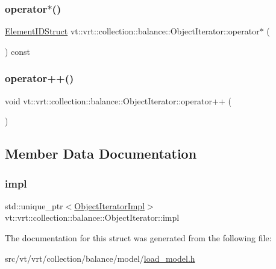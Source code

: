 \subsubsection{\texorpdfstring{operator$\ast$()}{operator*()}}
{\footnotesize\ttfamily \hyperlink{namespacevt_1_1vrt_1_1collection_1_1balance_a9f5b53fafb270212279a4757d2c4cd28}{Element\+I\+D\+Struct} vt\+::vrt\+::collection\+::balance\+::\+Object\+Iterator\+::operator$\ast$ (\begin{DoxyParamCaption}{ }\end{DoxyParamCaption}) const\hspace{0.3cm}{\ttfamily [inline]}}

\mbox{\label{structvt_1_1vrt_1_1collection_1_1balance_1_1_object_iterator_a22189471c74df1c8c1a29edf6f659244}} 
\subsubsection{\texorpdfstring{operator++()}{operator++()}}
{\footnotesize\ttfamily void vt\+::vrt\+::collection\+::balance\+::\+Object\+Iterator\+::operator++ (\begin{DoxyParamCaption}{ }\end{DoxyParamCaption})\hspace{0.3cm}{\ttfamily [inline]}}



\subsection{Member Data Documentation}
\mbox{\label{structvt_1_1vrt_1_1collection_1_1balance_1_1_object_iterator_abe8e8b725eca54696504c22edba21922}} 
\subsubsection{\texorpdfstring{impl}{impl}}
{\footnotesize\ttfamily std\+::unique\+\_\+ptr$<$\hyperlink{structvt_1_1vrt_1_1collection_1_1balance_1_1_object_iterator_impl}{Object\+Iterator\+Impl}$>$ vt\+::vrt\+::collection\+::balance\+::\+Object\+Iterator\+::impl\hspace{0.3cm}{\ttfamily [private]}}



The documentation for this struct was generated from the following file\+:\begin{DoxyCompactItemize}
\item 
src/vt/vrt/collection/balance/model/\hyperlink{load__model_8h}{load\+\_\+model.\+h}\end{DoxyCompactItemize}
